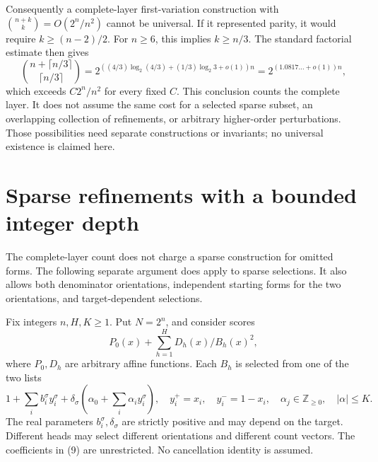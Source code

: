 \documentclass[11pt]{article}
\begin{document}
Consequently a complete-layer first-variation construction with
$\binom{n+k}{k}=O(2^n/n^2)$ cannot be universal. If it represented
parity, it would require $k\ge(n-2)/2$. For $n\ge6$, this implies
$k\ge n/3$. The standard factorial estimate then gives
\[
 \binom{n+\lceil n/3\rceil}{\lceil n/3\rceil}
 =2^{((4/3)\log_2(4/3)+(1/3)\log_2 3+o(1))n}
 =2^{(1.0817\ldots+o(1))n},
\]
which exceeds $C2^n/n^2$ for every fixed $C$. This conclusion counts
the complete layer. It does not assume the same cost for a selected
sparse subset, an overlapping collection of refinements, or arbitrary
higher-order perturbations. Those possibilities need separate
constructions or invariants; no universal existence is claimed here.

\section{Sparse refinements with a bounded integer depth}

The complete-layer count does not charge a sparse construction for omitted
forms. The following separate argument does apply to sparse selections.
It also allows both denominator orientations, independent starting forms
for the two orientations, and target-dependent selections.

Fix integers $n,H,K\ge1$. Put $N=2^n$, and consider scores
\[
 P_0(x)+\sum_{h=1}^H D_h(x)/B_h(x)^2,
 \tag{9}
\]
where $P_0,D_h$ are arbitrary affine functions. Each $B_h$ is selected
from one of the two lists
\[
 1+\sum_i b_i^\sigma y_i^\sigma+
 \delta_\sigma\left(\alpha_0+\sum_i\alpha_i y_i^\sigma\right),
 \quad y_i^+=x_i,\quad y_i^-=1-x_i,
 \quad \alpha_j\in\mathbb Z_{\ge0},\quad |\alpha|\le K.
 \tag{10}
\]
The real parameters $b_i^\sigma,\delta_\sigma$ are strictly positive
and may depend on the target. Different heads may select different
orientations and different count vectors. The coefficients in (9)
are unrestricted. No cancellation identity is assumed.
\end{document}
